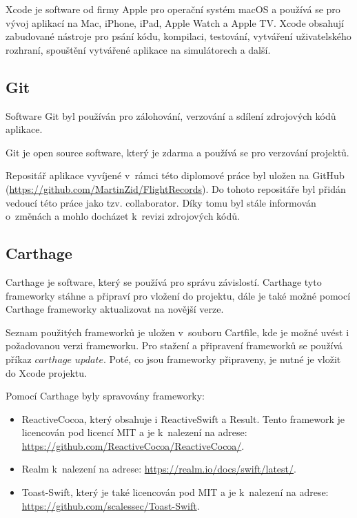 \documentclass[thesis=M,czech]{FITthesis}[2012/06/26]
\begin{document}
Xcode je software od firmy Apple pro operační systém macOS a používá se pro vývoj aplikací na Mac, iPhone, iPad, Apple Watch a Apple TV. Xcode obsahují zabudované nástroje pro psání kódu, kompilaci, testování, vytváření uživatelského rozhraní, spouštění vytvářené aplikace na simulátorech a další. \cite{Xcode}

\subsection{Git}
Software Git byl používán pro zálohování, verzování a sdílení zdrojových kódů aplikace. 

Git je open source software, který je zdarma a používá se pro verzování projektů. \cite{git}

Repositář aplikace vyvíjené v~rámci této diplomové práce byl uložen na GitHub (\url{https://github.com/MartinZid/FlightRecords}). Do tohoto repositáře byl přidán vedoucí této práce jako tzv. collaborator. Díky tomu byl stále informován o~změnách a mohlo docházet k~revizi zdrojových kódů.

\subsection{Carthage}
Carthage je software, který se používá pro správu závislostí. Carthage tyto frameworky stáhne a připraví pro vložení do projektu, dále je také možné pomocí Carthage frameworky aktualizovat na novější verze. \cite{carthage}

Seznam použitých frameworků je uložen v~souboru Cartfile, kde je možné uvést i požadovanou verzi frameworku. Pro stažení a připravení frameworků se používá příkaz $carthage$ $update$. Poté, co jsou frameworky připraveny, je nutné je vložit do Xcode projektu. \cite{carthage}

Pomocí Carthage byly spravovány frameworky:
\begin{itemize}
\item ReactiveCocoa, který obsahuje i ReactiveSwift a Result. Tento framework je licencován pod licencí MIT a je k~nalezení na adrese:\\ \url{https://github.com/ReactiveCocoa/ReactiveCocoa/}.
\item Realm k~nalezení na adrese: \url{https://realm.io/docs/swift/latest/}.
\item Toast-Swift, který je také licencován pod MIT a je k~nalezení na adrese: \url{https://github.com/scalessec/Toast-Swift}.
\end{itemize}
\end{document}
